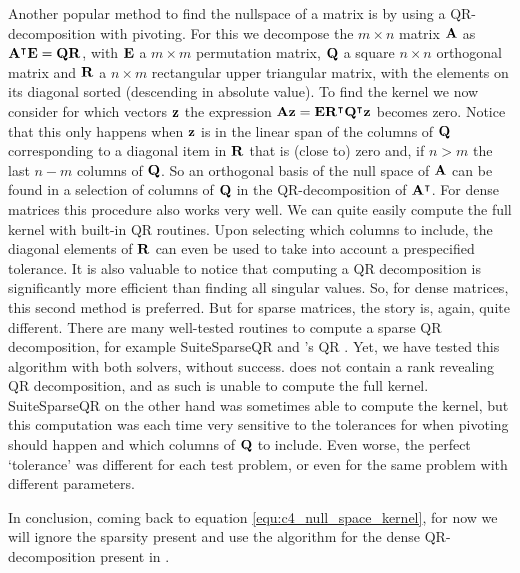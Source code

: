 Another popular\cite{trefethen_numerical_1997} method to find the nullspace of a matrix is by using a QR-decomposition with pivoting. For this we decompose the $m \times n$ matrix $\vb{A}$ as ${\vb{A}}^\intercal\vb{E} = \vb{Q} \vb{R}$, with $\vb{E}$ a $m\times m$ permutation matrix, $\vb{Q}$ a square $n \times n$ orthogonal matrix and $\vb{R}$ a $n \times m$ rectangular upper triangular matrix, with the elements on its diagonal sorted (descending in absolute value). To find the kernel we now consider for which vectors $\vb{z}$ the expression $\vb{A} \vb{z} = \vb{E}{\vb{R}}^\intercal{\vb{Q}}^\intercal\vb{z}$ becomes zero. Notice that this only happens when $\vb{z}$ is in the linear span of the columns of $\vb{Q}$ corresponding to a diagonal item in $\vb{R}$ that is (close to) zero and, if $n > m$ the last $n - m$ columns of $\vb{Q}$. So an orthogonal basis of the null space of $\vb{A}$ can be found in a selection of columns of $\vb{Q}$ in the QR-decomposition of ${\vb{A}}^\intercal$. For dense matrices this procedure also works very well. We can quite easily compute the full kernel with built-in QR routines. Upon selecting which columns to include, the diagonal elements of $\vb{R}$ can even be used to take into account a prespecified tolerance. It is also valuable to notice that computing a QR decomposition is significantly more efficient than finding all singular values. So, for dense matrices, this second method is preferred. But for sparse matrices, the story is, again, quite different. There are many well-tested routines to compute a sparse QR decomposition, for example SuiteSparseQR \cite{davis_algorithm_2011} and \Eigen's QR \cite{guennebaud_eigen_2010}. Yet, we have tested this algorithm with both solvers, without success. \Eigen does not contain a rank revealing QR decomposition, and as such is unable to compute the full kernel. SuiteSparseQR on the other hand was sometimes able to compute the kernel, but this computation was each time very sensitive to the tolerances for when pivoting should happen and which columns of $\vb{Q}$ to include. Even worse, the perfect `tolerance' was different for each test problem, or even for the same problem with different parameters.

In conclusion, coming back to equation \eqref{equ:c4_null_space_kernel}, for now we will ignore the sparsity present and use the algorithm for the dense QR-decomposition present in \Eigen \cite{guennebaud_eigen_2010}.

